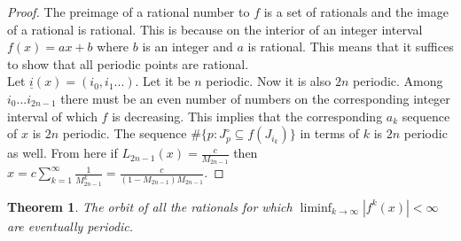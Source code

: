 \documentclass{article}
\newtheorem{theorem}{Theorem}[section]
\begin{document}
\begin{proof}
The preimage of a rational number to $f$ is a set of rationals and the image of a rational is rational. This is because on the interior of an integer interval $f(x) = ax+b$ where $b$ is an integer and $a$ is rational. This means that it suffices to show that all periodic points are rational.\\

Let $\underline{i}(x)=(i_0,i_1...)$. Let it be $n$ periodic. Now it is also $2n$ periodic. Among $i_0...i_{2n-1}$ there must be an even number of numbers on the corresponding integer interval of which $f$ is decreasing. This implies that the corresponding $a_k$ sequence of $x$ is $2n$ periodic. The sequence $\#\{p: J_p^\circ \subseteq f(J_{i_k})\}$ in terms of $k$ is $2n$ periodic as well. From here if $L_{2n-1}(x) = \frac{c}{M_{2n-1}}$ then $x = c\sum_{k=1}^\infty \frac{1}{M_{2n-1}^k} = \frac{c}{(1 - M_{2n-1})M_{2n-1}}$.
\end{proof}

\begin{theorem} \label{bondolt}
The orbit of all the rationals for which $\liminf_{k\rightarrow \infty} |f^k(x)| < \infty$ are eventually periodic.
\end{theorem}
\end{document}
